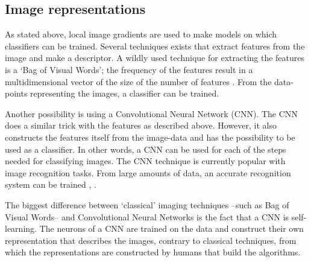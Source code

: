 
\subsection{Image representations}
\label{sec:Theory-image}
As stated above, local image gradients are used to make models on which classifiers can be trained.
Several techniques exists that extract features from the image and make a descriptor.
A wildly used technique for extracting the features is a `Bag of Visual Words'; the frequency of the features result in a multidimensional vector of the size of the number of features \citep{csurka2004visual}.
From the data-points representing the images, a classifier can be trained.

Another possibility is using a Convolutional Neural Network (CNN).
The CNN does a similar trick with the features as described above.
However, it also constructs the features itself from the image-data and has the possibility to be used as a classifier.
In other words, a CNN can be used for each of the steps needed for classifying images.
The CNN technique is currently popular with image recognition tasks.
From large amounts of data, an accurate recognition system can be trained \citep{girshick2014rich}, \citep{razavian2014cnn}.

The biggest difference between `classical' imaging techniques --such as Bag of Visual Words-- and Convolutional Neural Networks is the fact that a CNN is self-learning.
The neurons of a CNN are trained on the data and construct their own representation that describes the images, contrary to classical techniques, from which the representations are constructed by humans that build the algorithms.



